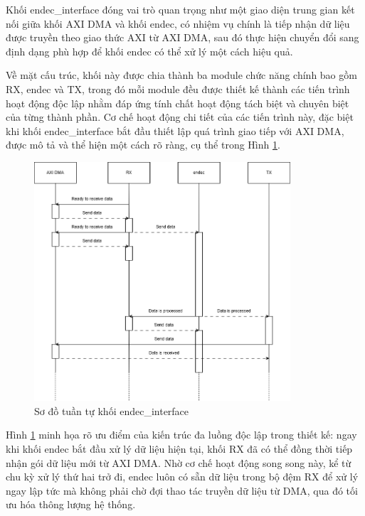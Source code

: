 \documentclass[../DoAn.tex]{subfiles}
\begin{document}
Khối endec\_interface đóng vai trò quan trọng như một giao diện trung gian kết nối giữa khối AXI DMA và khối endec, có nhiệm vụ chính là tiếp nhận dữ liệu được truyền theo giao thức AXI từ AXI DMA, sau đó thực hiện chuyển đổi sang định dạng phù hợp để khối endec có thể xử lý một cách hiệu quả. 

Về mặt cấu trúc, khối này được chia thành ba module chức năng chính bao gồm RX, endec và TX, trong đó mỗi module đều được thiết kế thành các tiến trình hoạt động độc lập nhằm đáp ứng tính chất hoạt động tách biệt và chuyên biệt của từng thành phần. Cơ chế hoạt động chi tiết của các tiến trình này, đặc biệt khi khối endec\_interface bắt đầu thiết lập quá trình giao tiếp với AXI DMA, được mô tả và thể hiện một cách rõ ràng, cụ thể trong Hình \ref{fig:Sơ đồ tuần tự khối endec_interface}.

\begin{figure}[H]
    \centering
    \includegraphics[width=0.85\textwidth, height=0.3\textheight, keepaspectratio]{Hinhve/Chuong 4/endec interface sequence.png}
    \caption{Sơ đồ tuần tự khối endec\_interface}
    \label{fig:Sơ đồ tuần tự khối endec_interface}
\end{figure}

Hình \ref{fig:Sơ đồ tuần tự khối endec_interface} minh họa rõ ưu điểm của kiến trúc đa luồng độc lập trong thiết kế: ngay khi khối endec bắt đầu xử lý dữ liệu hiện tại, khối RX đã có thể đồng thời tiếp nhận gói dữ liệu mới từ AXI DMA. Nhờ cơ chế hoạt động song song này, kể từ chu kỳ xử lý thứ hai trở đi, endec luôn có sẵn dữ liệu trong bộ đệm RX để xử lý ngay lập tức mà không phải chờ đợi thao tác truyền dữ liệu từ DMA, qua đó tối ưu hóa thông lượng hệ thống.
\end{document}
